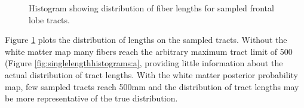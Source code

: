\begin{figure}
	\caption{Histogram showing distribution of fiber lengths for sampled frontal lobe tracts.}
  \label{fig:singelengthhistograms}
\end{figure}

Figure \ref{fig:singelengthhistograms} plots the distribution of lengths on the sampled tracts.  Without the white matter map many fibers reach the arbitrary maximum tract limit of 500 (Figure \ref{fig:singlelengthhistograms:a}, providing little information about the actual distribution of tract lengths.  With the white matter posterior probability map, few sampled tracts reach 500mm and the distribution of tract lengths may be more representative of the true distribution.


